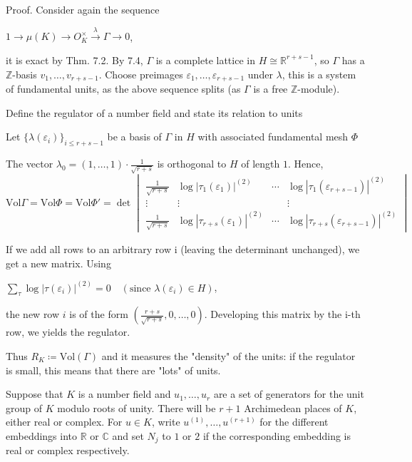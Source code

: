 Proof. Consider again the sequence

\(1 \longrightarrow \mu(K) \longrightarrow O_K^\times \xrightarrow{\lambda} \Gamma \longrightarrow 0\),

it is exact by Thm. 7.2. By 7.4, \(\Gamma\) is a complete lattice in \(H \cong \mathbb{R}^{r+s-1}\), so \(\Gamma\) has a \(\mathbb{Z}\)-basis 
\(v_1, \ldots, v_{r+s-1}\). Choose preimages \(\varepsilon_1, \ldots, \varepsilon_{r+s-1}\) under \(\lambda\), 
this is a system of fundamental units, as the above sequence splits (as \(\Gamma\) is a free \(\mathbb{Z}\)-module).



Define the regulator of a number field and state its relation to units

Let \( \{\lambda(\varepsilon_i)\}_{i \leq r+s-1} \) be a basis of \( \Gamma \) in \( H \) with associated fundamental mesh \( \Phi \)

The vector \(\lambda_0 = (1, \ldots, 1) \cdot \frac{1}{\sqrt{r+s}}\) is orthogonal to \( H \) of length \( 1 \). Hence,
\[
\text{Vol} \Gamma = \text{Vol} \Phi = \text{Vol} \Phi' = \det \begin{vmatrix}
\frac{1}{\sqrt{r+s}} & \log|\tau_1(\varepsilon_1)|^{(2)} & \cdots & \log|\tau_1(\varepsilon_{r+s-1})|^{(2)} \\
\vdots & \vdots & & \vdots \\
\frac{1}{\sqrt{r+s}} & \log|\tau_{r+s}(\varepsilon_1)|^{(2)} & \cdots & \log|\tau_{r+s}(\varepsilon_{r+s-1})|^{(2)}
\end{vmatrix}
\]

If we add all rows to an arbitrary row i (leaving the determinant unchanged), we get a new matrix. Using

\(\sum_{\tau} \log|\tau(\varepsilon_i)|^{(2)} = 0 \quad (\text{since }\lambda(\varepsilon_i) \in H)\),

the new row \( i \) is of the form \(\left(\frac{r+s}{\sqrt{r+s}}, 0, \ldots, 0\right)\). 
Developing this matrix by the i-th row, we yields the regulator.

Thus \( R_K \coloneqq \text{Vol}(\Gamma) \) and it measures the "density" of the units: 
if the regulator is small, this means that there are "lots" of units.




Suppose that \( K \) is a number field and \( u_1, \dots, u_r \) are a set of generators for the unit group of \( K \) modulo roots of unity. 
There will be \( r+1 \) Archimedean places of \( K \), either real or complex. For \(u \in K\), write \(u^{(1)},\dots,u^{(r+1)}\) for the 
different embeddings into \(\mathbb{R}\) or \(\mathbb{C}\) and set \(N_j\) to \( 1 \) or \( 2 \) if the corresponding embedding is 
real or complex respectively. 

